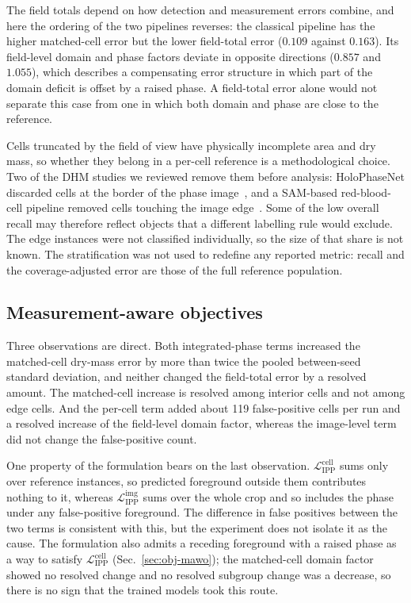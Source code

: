 \documentclass[11pt]{article}
\newcommand{\Lippc}{\mathcal{L}_\mathrm{IPP}^\mathrm{cell}}
\newcommand{\Lippi}{\mathcal{L}_\mathrm{IPP}^\mathrm{img}}
\begin{document}
The field totals depend on how detection and measurement errors combine, and
here the ordering of the two pipelines reverses: the classical pipeline has the
higher matched-cell error but the lower field-total error ($0.109$ against
$0.163$). Its field-level domain and phase factors deviate in opposite
directions ($0.857$ and $1.055$), which describes a compensating error
structure in which part of the domain deficit is offset by a raised phase. A
field-total error alone would not separate this case from one in which both
domain and phase are close to the reference.

Cells truncated by the field of view have physically incomplete area and dry
mass, so whether they belong in a per-cell reference is a methodological
choice. Two of the DHM studies we reviewed remove them before analysis:
HoloPhaseNet discarded cells at the border of the phase
image~\cite{jaferzadeh2022holophasenet}, and a SAM-based red-blood-cell
pipeline removed cells touching the image edge~\cite{numata2024rbcsam}. Some of
the low overall recall may therefore reflect objects that a different labelling
rule would exclude. The edge instances were not classified individually, so the
size of that share is not known. The stratification was not used to redefine
any reported metric: recall and the coverage-adjusted error are those of the
full reference population.

\subsection{Measurement-aware objectives}
\label{sec:disc-mawo}

Three observations are direct. Both integrated-phase terms increased the
matched-cell dry-mass error by more than twice the pooled between-seed standard
deviation, and neither changed the field-total error by a resolved amount. The
matched-cell increase is resolved among interior cells and not among edge
cells. And the per-cell term added about 119 false-positive cells per run and a
resolved increase of the field-level domain factor, whereas the image-level
term did not change the false-positive count.

One property of the formulation bears on the last observation. $\Lippc$ sums
only over reference instances, so predicted foreground outside them contributes
nothing to it, whereas $\Lippi$ sums over the whole crop and so includes the
phase under any false-positive foreground. The difference in false positives
between the two terms is consistent with this, but the experiment does not
isolate it as the cause. The formulation also admits a receding foreground with
a raised phase as a way to satisfy $\Lippc$ (Sec.~\ref{sec:obj-mawo}); the
matched-cell domain factor showed no resolved change and no resolved subgroup change was a decrease, so there is no sign that the trained models took
this route.
\end{document}
